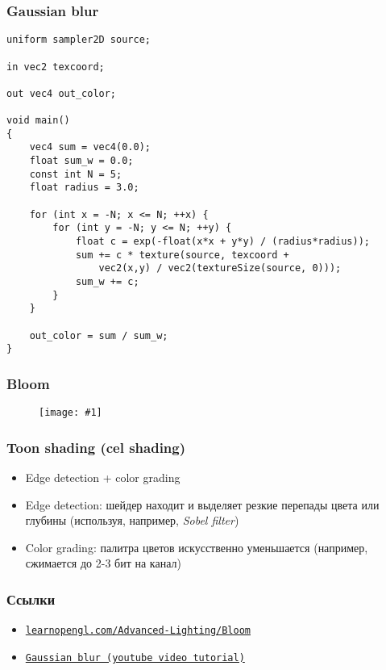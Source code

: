 \documentclass[10pt]{beamer}
\newcommand{\slideimage}[1]{
  \begin{figure}
    \begin{adjustbox}{width=\textwidth, totalheight=\textheight-2\baselineskip-2\baselineskip,keepaspectratio}
      \texttt{[image: \#1]}
    \end{adjustbox}
  \end{figure}
}
\begin{document}
\begin{frame}[fragile]
\frametitle{Gaussian blur}
\fontsize{10pt}{10pt}
\begin{verbatim}
uniform sampler2D source;

in vec2 texcoord;

out vec4 out_color;

void main()
{
    vec4 sum = vec4(0.0);
    float sum_w = 0.0;
    const int N = 5;
    float radius = 3.0;

    for (int x = -N; x <= N; ++x) {
        for (int y = -N; y <= N; ++y) {
            float c = exp(-float(x*x + y*y) / (radius*radius));
            sum += c * texture(source, texcoord +
                vec2(x,y) / vec2(textureSize(source, 0)));
            sum_w += c;
        }
    }

    out_color = sum / sum_w;
}
\end{verbatim}
\end{frame}

\begin{frame}[fragile]
\frametitle{Bloom}
\slideimage{bloom-diagram.png}
\end{frame}

\begin{frame}[fragile]
\frametitle{Toon shading (cel shading)}
\begin{itemize}
\item Edge detection + color grading
\pause
\item Edge detection: шейдер находит и выделяет резкие перепады цвета или глубины (используя, например, \textit{Sobel filter})
\pause
\item Color grading: палитра цветов искусственно уменьшается (например, сжимается до 2-3 бит на канал)
\end{itemize}
\end{frame}

\begin{frame}[fragile]
\frametitle{Ссылки}
\begin{itemize}
\item \href{https://learnopengl.com/Advanced-Lighting/Bloom}{\nolinkurl{learnopengl.com/Advanced-Lighting/Bloom}}
\item \href{https://www.youtube.com/watch?v=uZlwbWqQKpc}{\texttt{Gaussian blur (youtube video tutorial)}}
\end{itemize}
\end{frame}
\end{document}

